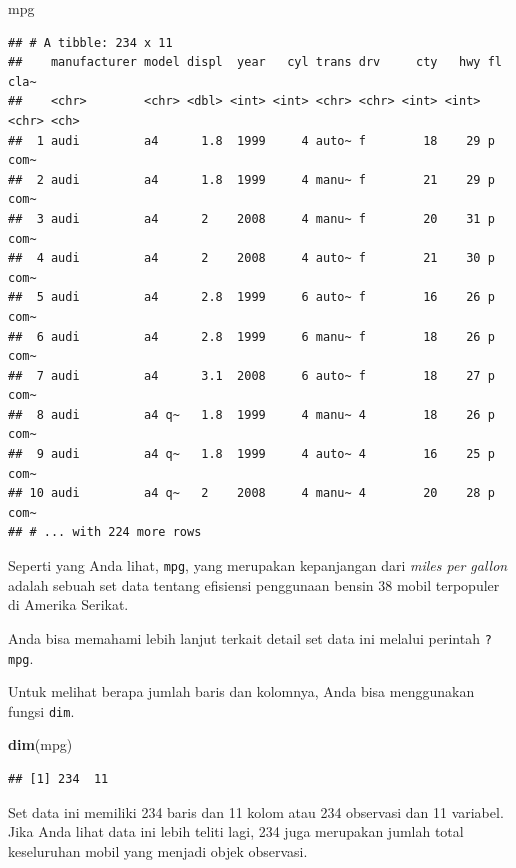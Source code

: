 \documentclass[openany]{book}
\newenvironment{Shaded}{\begin{snugshade}}{\end{snugshade}}
\newcommand{\KeywordTok}[1]{\textcolor[rgb]{0.13,0.29,0.53}{\textbf{#1}}}
\newcommand{\NormalTok}[1]{#1}
\begin{document}
\begin{Shaded}
\begin{Highlighting}[]
\NormalTok{mpg}
\end{Highlighting}
\end{Shaded}

\begin{verbatim}
## # A tibble: 234 x 11
##    manufacturer model displ  year   cyl trans drv     cty   hwy fl    cla~
##    <chr>        <chr> <dbl> <int> <int> <chr> <chr> <int> <int> <chr> <ch>
##  1 audi         a4      1.8  1999     4 auto~ f        18    29 p     com~
##  2 audi         a4      1.8  1999     4 manu~ f        21    29 p     com~
##  3 audi         a4      2    2008     4 manu~ f        20    31 p     com~
##  4 audi         a4      2    2008     4 auto~ f        21    30 p     com~
##  5 audi         a4      2.8  1999     6 auto~ f        16    26 p     com~
##  6 audi         a4      2.8  1999     6 manu~ f        18    26 p     com~
##  7 audi         a4      3.1  2008     6 auto~ f        18    27 p     com~
##  8 audi         a4 q~   1.8  1999     4 manu~ 4        18    26 p     com~
##  9 audi         a4 q~   1.8  1999     4 auto~ 4        16    25 p     com~
## 10 audi         a4 q~   2    2008     4 manu~ 4        20    28 p     com~
## # ... with 224 more rows
\end{verbatim}

Seperti yang Anda lihat, \texttt{mpg}, yang merupakan kepanjangan dari
\emph{miles per gallon} adalah sebuah set data tentang efisiensi
penggunaan bensin 38 mobil terpopuler di Amerika Serikat.

Anda bisa memahami lebih lanjut terkait detail set data ini melalui
perintah \texttt{?mpg}.

Untuk melihat berapa jumlah baris dan kolomnya, Anda bisa menggunakan
fungsi \texttt{dim}.

\begin{Shaded}
\begin{Highlighting}[]
\KeywordTok{dim}\NormalTok{(mpg)}
\end{Highlighting}
\end{Shaded}

\begin{verbatim}
## [1] 234  11
\end{verbatim}

Set data ini memiliki 234 baris dan 11 kolom atau 234 observasi dan 11
variabel. Jika Anda lihat data ini lebih teliti lagi, 234 juga merupakan
jumlah total keseluruhan mobil yang menjadi objek observasi.
\end{document}
